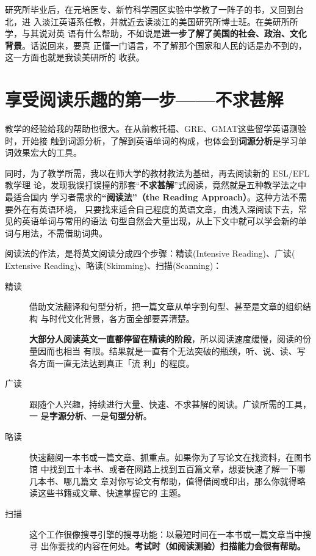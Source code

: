研究所毕业后，在元培医专、新竹科学园区实验中学教了一阵子的书，又回到台北，进
入淡江英语系任教，并就近去读淡江的美国研究所博士班。在美研所所学，与其说对英
语有什么帮助，不如说是\textbf{进一步了解了美国的社会、政治、文化背景}。话说回来，要真
正懂一门语言，不了解那个国家和人民的话是办不到的，这一方面也就是我读美研所的
收获。

\section*{享受阅读乐趣的第一步——不求甚解}

教学的经验给我的帮助也很大。在从前教托福、GRE、GMAT这些留学英语测验时，开始接
触到词源分析，了解到英语单词的构成，也体会到\textbf{词源分析}是学习单词效果宏大的工具。

同时，为了教学所需，我以在师大学的教材教法为基础，再去阅读新的 ESL/EFL教学理
论，发现我误打误撞的那套“\textbf{不求甚解}”式阅读，竟然就是五种教学法之中最适合国内
学习者需求的\textbf{“阅读法”（the Reading Approach）}。这种方法不需要外在有英语环境，
只要找来适合自己程度的英语文章，由浅入深阅读下去，常见的英语单词与常用的语法
句型自然会大量出现，从上下文中就可以学会新的单词与用法，不需借助词典。

阅读法的作法，是将英文阅读分成四个步骤：精读(Intensive Reading)、广读(
Extensive Reading)、略读(Skimming)、扫描(Scanning)：
\begin{description}
\item[精读] 借助文法翻译和句型分析，把一篇文章从单字到句型、甚至是文章的组织结构
  与时代文化背景，各方面全部要弄清楚。

  \textbf{大部分人阅读英文一直都停留在精读的阶段}，所以阅读速度缓慢，阅读的份量因而也相当
  有限。结果就是一直有个无法突破的瓶颈，听、说、读、写各方面一直无法达到真正「流
  利」的程度。

\item[广读] 跟随个人兴趣，持续进行大量、快速、不求甚解的阅读。广读所需的工具，一
  是\textbf{字源分析}、一是\textbf{句型分析}。

\item[略读] 快速翻阅一本书或一篇文章、抓重点。如果你为了写论文在找资料，在图书馆
  中找到五十本书、或者在网路上找到五百篇文章，想要快速了解一下哪几本书、哪几篇文
  章对你写论文有帮助，值得借阅或印出，那么你就得略读这些书籍或文章、快速掌握它的
  主题。

\item[扫描] 这个工作很像搜寻引擎的搜寻功能：以最短时间在一本书或一篇文章当中搜寻
  出你要找的内容在何处。\textbf{考试时（如阅读测验）扫描能力会很有帮助。}

\end{description}

